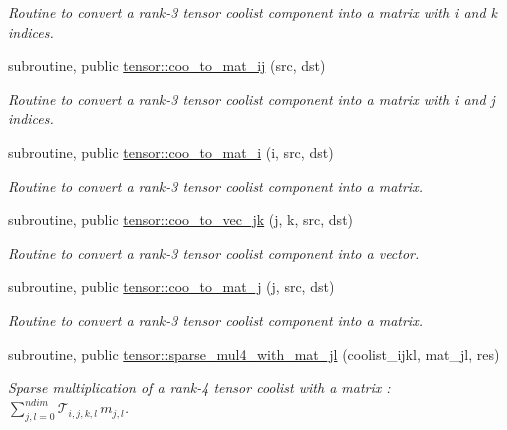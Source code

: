 \begin{DoxyCompactItemize}
\begin{DoxyCompactList}\small\item\em Routine to convert a rank-\/3 tensor coolist component into a matrix with i and k indices. \end{DoxyCompactList}\item 
subroutine, public \hyperlink{namespacetensor_af104cb6f7354f1465eb53e0f3738a3d0}{tensor\+::coo\+\_\+to\+\_\+mat\+\_\+ij} (src, dst)
\begin{DoxyCompactList}\small\item\em Routine to convert a rank-\/3 tensor coolist component into a matrix with i and j indices. \end{DoxyCompactList}\item 
subroutine, public \hyperlink{namespacetensor_ac77bcc80d4bd189835b88db68ffafda4}{tensor\+::coo\+\_\+to\+\_\+mat\+\_\+i} (i, src, dst)
\begin{DoxyCompactList}\small\item\em Routine to convert a rank-\/3 tensor coolist component into a matrix. \end{DoxyCompactList}\item 
subroutine, public \hyperlink{namespacetensor_abb370166c0ebd0885404c1703d464f89}{tensor\+::coo\+\_\+to\+\_\+vec\+\_\+jk} (j, k, src, dst)
\begin{DoxyCompactList}\small\item\em Routine to convert a rank-\/3 tensor coolist component into a vector. \end{DoxyCompactList}\item 
subroutine, public \hyperlink{namespacetensor_a2088d80a587fd931ca64976a87403401}{tensor\+::coo\+\_\+to\+\_\+mat\+\_\+j} (j, src, dst)
\begin{DoxyCompactList}\small\item\em Routine to convert a rank-\/3 tensor coolist component into a matrix. \end{DoxyCompactList}\item 
subroutine, public \hyperlink{namespacetensor_aae291b0fab419ce7692da1933105e9ae}{tensor\+::sparse\+\_\+mul4\+\_\+with\+\_\+mat\+\_\+jl} (coolist\+\_\+ijkl, mat\+\_\+jl, res)
\begin{DoxyCompactList}\small\item\em Sparse multiplication of a rank-\/4 tensor coolist with a matrix \+: ${\displaystyle \sum_{j,l=0}^{ndim}} \mathcal{T}_{i,j,k,l} \, m_{j,l} $. \end{DoxyCompactList}\item 

\end{DoxyCompactItemize}
